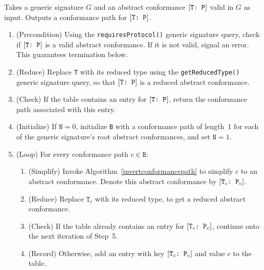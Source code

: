 \documentclass[../generics]{subfiles}
\begin{document}
\begin{algorithm}\label{find conformance path algorithm}
Takes a generic signature $G$ and an abstract conformance $[\texttt{T:~P}]$ valid in $G$ as input. Outputs a conformance path for $[\texttt{T:~P}]$.

\begin{enumerate}
\item (Precondition) Using the \texttt{requiresProtocol()} generic signature query, check if $[\texttt{T:~P}]$ is a valid abstract conformance. If it is not valid, signal an error. This guarantees termination below.

\item (Reduce) Replace \texttt{T} with its reduced type using the \texttt{getReducedType()} generic signature query, so that $[\texttt{T:~P}]$ is a reduced abstract conformance.

\item (Check) If the table contains an entry for $[\texttt{T:~P}]$, return the conformance path associated with this entry.

\item (Initialize) If $\texttt{N}=0$, initialize \texttt{B} with a conformance path of length~1 for each of the generic signature's root abstract conformances, and set $\texttt{N}=1$.

\item (Loop) For every conformance path $c\in \texttt{B}$:

\begin{enumerate}

\item (Simplify) Invoke Algorithm~\ref{invertconformancepath} to simplify $c$ to an abstract conformance. Denote this abstract conformance by $[\texttt{$\texttt{T}_c$:~$\texttt{P}_c$}]$.

\item (Reduce) Replace $\texttt{T}_c$ with its reduced type, to get a reduced abstract conformance.

\item (Check) If the table already contains an entry for $[\texttt{$\texttt{T}_c$:~$\texttt{P}_c$}]$, continue onto the next iteration of Step~5.

\item (Record) Otherwise, add an entry with key $[\texttt{$\texttt{T}_c$:~$\texttt{P}_c$}]$ and value $c$ to the table.


\end{enumerate}
\end{enumerate}
\end{algorithm}
\end{document}
